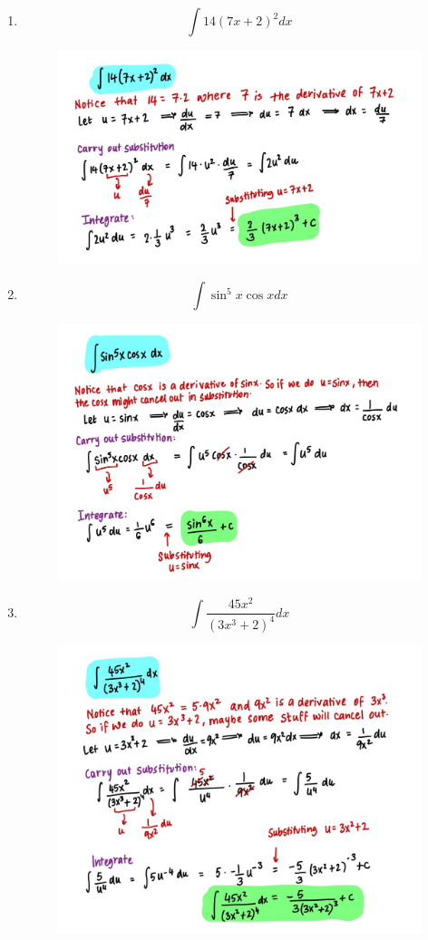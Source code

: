 \documentclass{article}
\begin{document}
\begin{enumerate}
\begin{figure}[H]
        \label{fig:Q3}
    \end{figure}
    \item $$\int{14(7x+2)^2}dx$$
     \begin{figure}[H]
        \centering
        \includegraphics[width=0.8\linewidth]{Q4.jpg}
        \label{fig:Q4}
    \end{figure}
    \item $$\int{\sin^5x\cos x}dx$$
     \begin{figure}[H]
        \centering
        \includegraphics[width=0.7\linewidth]{Q5.jpg}
        \label{fig:Q5}
    \end{figure}
    \item $$\int{\frac{45x^2}{(3x^3+2)^4}}dx$$
     \begin{figure}[H]
        \centering
        \includegraphics[width=0.7\linewidth]{Q6.jpg}
        \label{fig:Q6}
    \end{figure}
\end{enumerate}
\end{document}
